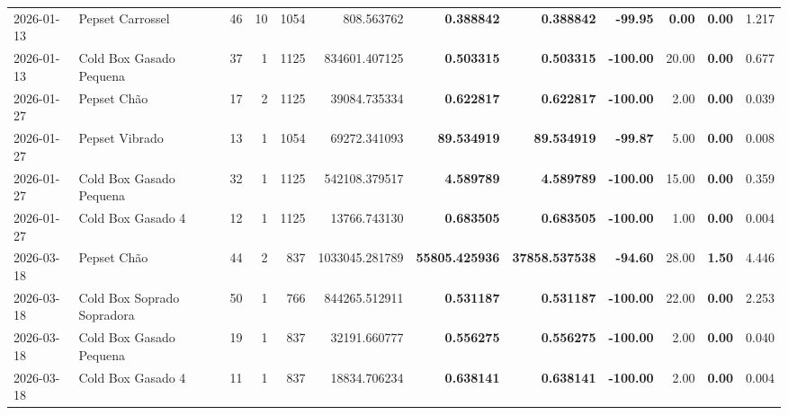 {\begin{center}
{\begin{tabular}{@{}llrrrrrrrrrr@{}}
2026-01-13 & Pepset Carrossel & 46 & 10 & 1054 & 808.563762 & \textbf{0.388842} & \textbf{0.388842} & \textbf{-99.95} & \textbf{0.00} & \textbf{0.00} & 1.217 \\
2026-01-13 & Cold Box Gasado Pequena & 37 & 1 & 1125 & 834601.407125 & \textbf{0.503315} & \textbf{0.503315} & \textbf{-100.00} & 20.00 & \textbf{0.00} & 0.677 \\
2026-01-27 & Pepset Chão & 17 & 2 & 1125 & 39084.735334 & \textbf{0.622817} & \textbf{0.622817} & \textbf{-100.00} & 2.00 & \textbf{0.00} & 0.039 \\
2026-01-27 & Pepset Vibrado & 13 & 1 & 1054 & 69272.341093 & \textbf{89.534919} & \textbf{89.534919} & \textbf{-99.87} & 5.00 & \textbf{0.00} & 0.008 \\
2026-01-27 & Cold Box Gasado Pequena & 32 & 1 & 1125 & 542108.379517 & \textbf{4.589789} & \textbf{4.589789} & \textbf{-100.00} & 15.00 & \textbf{0.00} & 0.359 \\
2026-01-27 & Cold Box Gasado 4 & 12 & 1 & 1125 & 13766.743130 & \textbf{0.683505} & \textbf{0.683505} & \textbf{-100.00} & 1.00 & \textbf{0.00} & 0.004 \\
2026-03-18 & Pepset Chão & 44 & 2 & 837 & 1033045.281789 & \textbf{55805.425936} & \textbf{37858.537538} & \textbf{-94.60} & 28.00 & \textbf{1.50} & 4.446 \\
2026-03-18 & Cold Box Soprado Sopradora & 50 & 1 & 766 & 844265.512911 & \textbf{0.531187} & \textbf{0.531187} & \textbf{-100.00} & 22.00 & \textbf{0.00} & 2.253 \\
2026-03-18 & Cold Box Gasado Pequena & 19 & 1 & 837 & 32191.660777 & \textbf{0.556275} & \textbf{0.556275} & \textbf{-100.00} & 2.00 & \textbf{0.00} & 0.040 \\
2026-03-18 & Cold Box Gasado 4 & 11 & 1 & 837 & 18834.706234 & \textbf{0.638141} & \textbf{0.638141} & \textbf{-100.00} & 2.00 & \textbf{0.00} & 0.004 \\
\bottomrule
\end{tabular}%
}
\end{center}
}
\vspace*{\fill}
